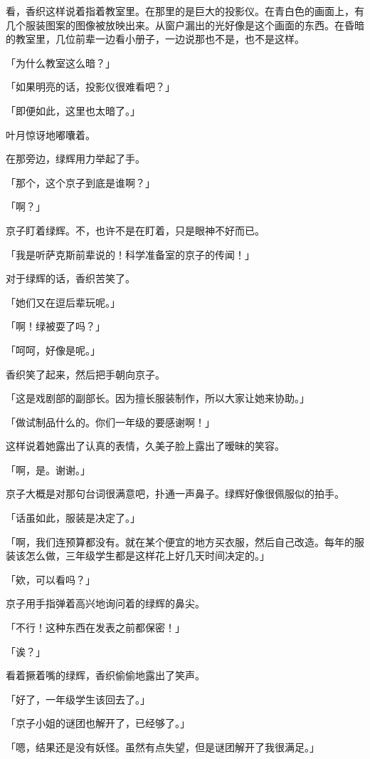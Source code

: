 \documentclass[UTF8]{ctexart}
\begin{document}
    看，香织这样说着指着教室里。在那里的是巨大的投影仪。在青白色的画面上，有几个服装图案的图像被放映出来。从窗户漏出的光好像是这个画面的东西。在昏暗的教室里，几位前辈一边看小册子，一边说那也不是，也不是这样。

    「为什么教室这么暗？」

    「如果明亮的话，投影仪很难看吧？」

    「即便如此，这里也太暗了。」

    叶月惊讶地嘟囔着。

    在那旁边，绿辉用力举起了手。

    「那个，这个京子到底是谁啊？」

    「啊？」

    京子盯着绿辉。不，也许不是在盯着，只是眼神不好而已。

    「我是听萨克斯前辈说的！科学准备室的京子的传闻！」

    对于绿辉的话，香织苦笑了。

    「她们又在逗后辈玩呢。」

    「啊！绿被耍了吗？」

    「呵呵，好像是呢。」

    香织笑了起来，然后把手朝向京子。

    「这是戏剧部的副部长。因为擅长服装制作，所以大家让她来协助。」

    「做试制品什么的。你们一年级的要感谢啊！」

    这样说着她露出了认真的表情，久美子脸上露出了暧昧的笑容。

    「啊，是。谢谢。」

    京子大概是对那句台词很满意吧，扑通一声鼻子。绿辉好像很佩服似的拍手。

    「话虽如此，服装是决定了。」

    「啊，我们连预算都没有。就在某个便宜的地方买衣服，然后自己改造。每年的服装该怎么做，三年级学生都是这样花上好几天时间决定的。」

    「欸，可以看吗？」

    京子用手指弹着高兴地询问着的绿辉的鼻尖。

    「不行！这种东西在发表之前都保密！」

    「诶？」

    看着撅着嘴的绿辉，香织偷偷地露出了笑声。

    「好了，一年级学生该回去了。」

    「京子小姐的谜团也解开了，已经够了。」

    「嗯，结果还是没有妖怪。虽然有点失望，但是谜团解开了我很满足。」
\end{document}
